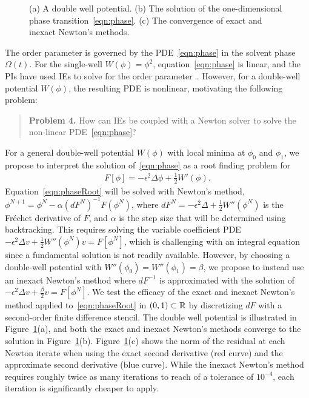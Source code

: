 \begin{figure}
  \vspace{-8pt}
  \centering
   
  \caption{\label{fig:CA} \footnotesize (a) A double well potential. (b)
  The solution of the one-dimensional phase
  transition~\eqref{eqn:phase}. (c) The convergence of exact and inexact
  Newton's methods.}
\end{figure}

The order parameter is governed by the PDE~\eqref{eqn:phase} in the
solvent phase $\Omega(t)$. For the single-well $W(\phi) = \phi^2$,
equation~\eqref{eqn:phase} is linear, and the PIs have used IEs to solve
for the order parameter~\cite{Fu2018_SIAM, FuQuRyYo22,
fu-ryh-qua-you2022}. However, for a double-well potential $W(\phi)$, the
resulting PDE is nonlinear, motivating the following problem:

\begin{quotation}
  \noindent
  \textbf{Problem 4.} How can IEs be coupled with a Newton solver to
  solve the non-linear PDE~\eqref{eqn:phase}?
\end{quotation}

For a general double-well potential $W(\phi)$ with local minima at
$\phi_0$ and $\phi_1$, we propose to interpret the solution
of~\eqref{eqn:phase} as a root finding problem for
\begin{align}
  \label{eqn:phaseRoot}
  F[\phi] = -\epsilon^2 \Delta \phi + \tfrac{1}{2}W'(\phi).
\end{align}
Equation~\eqref{eqn:phaseRoot} will be solved with Newton's method,
$\phi^{N+1} = \phi^{N} - \alpha (dF^N)^{-1} F(\phi^N)$, where $dF^N =
-\epsilon^2 \Delta + \tfrac{1}{2}W''(\phi^N)$ is the Fr\'{e}chet
derivative of $F$, and $\alpha$ is the step size that will be determined
using backtracking. This requires solving the variable coefficient PDE
$-\epsilon^2 \Delta v + \tfrac{1}{2}W''(\phi^{N}) v = F[\phi^N]$, which
is challenging with an integral equation since a fundamental solution is
not readily available. However, by choosing a double-well potential with
$W''(\phi_0) = W''(\phi_1) = \beta$, we propose to instead use an
inexact Newton's method where $dF^{-1}$ is approximated with the
solution of $-\epsilon^2 \Delta v + \tfrac{\beta}{2} v = F[\phi^N]$. We
test the efficacy of the exact and inexact Newton's method applied
to~\eqref{eqn:phaseRoot} in $(0,1) \subset \mathbb{R}$ by discretizing $dF$
with a second-order finite difference stencil. The double well potential
is illustrated in Figure~\ref{fig:CA}(a), and both the exact and inexact
Newton's methods converge to the solution in Figure~\ref{fig:CA}(b).
Figure~\ref{fig:CA}(c) shows the norm of the residual at each Newton
iterate when using the exact second derivative (red curve) and the
approximate second derivative (blue curve). While the inexact Newton's
method requires roughly twice as many iterations to reach of a tolerance
of $10^{-4}$, each iteration is significantly cheaper to apply.

